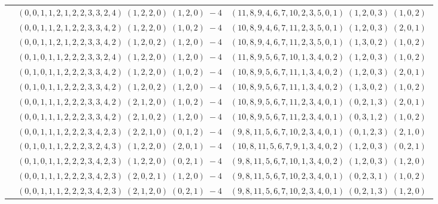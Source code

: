\documentclass[11pt]{article}
\begin{document}
\begin{longtable}[l]{|c|c|c|}
 \cline{2-3} 
 & $(0 ,0 ,1 ,1 ,2 ,1 ,2 ,2 ,3 ,3 ,2 ,4) \;(1 ,2 ,2 ,0) \;(1 ,2 ,0) \;-4$ & $(11 ,8 ,9 ,4 ,6 ,7 ,10 ,2 ,3 ,5 ,0 ,1) \;(1 ,2 ,0 ,3) \;(1 ,0 ,2) \;$\\ 
 \cline{2-3} 
 & $(0 ,0 ,1 ,1 ,2 ,1 ,2 ,2 ,3 ,3 ,4 ,2) \;(1 ,2 ,2 ,0) \;(1 ,0 ,2) \;-4$ & $(10 ,8 ,9 ,4 ,6 ,7 ,11 ,2 ,3 ,5 ,0 ,1) \;(1 ,2 ,0 ,3) \;(2 ,0 ,1) \;$\\ 
 \cline{2-3} 
 & $(0 ,0 ,1 ,1 ,2 ,1 ,2 ,2 ,3 ,3 ,4 ,2) \;(1 ,2 ,0 ,2) \;(1 ,2 ,0) \;-4$ & $(10 ,8 ,9 ,4 ,6 ,7 ,11 ,2 ,3 ,5 ,0 ,1) \;(1 ,3 ,0 ,2) \;(1 ,0 ,2) \;$\\ 
 \cline{2-3} 
 & $(0 ,1 ,0 ,1 ,1 ,2 ,2 ,2 ,3 ,3 ,2 ,4) \;(1 ,2 ,2 ,0) \;(1 ,2 ,0) \;-4$ & $(11 ,8 ,9 ,5 ,6 ,7 ,10 ,1 ,3 ,4 ,0 ,2) \;(1 ,2 ,0 ,3) \;(1 ,0 ,2) \;$\\ 
 \cline{2-3} 
 & $(0 ,1 ,0 ,1 ,1 ,2 ,2 ,2 ,3 ,3 ,4 ,2) \;(1 ,2 ,2 ,0) \;(1 ,0 ,2) \;-4$ & $(10 ,8 ,9 ,5 ,6 ,7 ,11 ,1 ,3 ,4 ,0 ,2) \;(1 ,2 ,0 ,3) \;(2 ,0 ,1) \;$\\ 
 \cline{2-3} 
 & $(0 ,1 ,0 ,1 ,1 ,2 ,2 ,2 ,3 ,3 ,4 ,2) \;(1 ,2 ,0 ,2) \;(1 ,2 ,0) \;-4$ & $(10 ,8 ,9 ,5 ,6 ,7 ,11 ,1 ,3 ,4 ,0 ,2) \;(1 ,3 ,0 ,2) \;(1 ,0 ,2) \;$\\ 
 \cline{2-3} 
 & $(0 ,0 ,1 ,1 ,1 ,2 ,2 ,2 ,3 ,3 ,4 ,2) \;(2 ,1 ,2 ,0) \;(1 ,0 ,2) \;-4$ & $(10 ,8 ,9 ,5 ,6 ,7 ,11 ,2 ,3 ,4 ,0 ,1) \;(0 ,2 ,1 ,3) \;(2 ,0 ,1) \;$\\ 
 \cline{2-3} 
 & $(0 ,0 ,1 ,1 ,1 ,2 ,2 ,2 ,3 ,3 ,4 ,2) \;(2 ,1 ,0 ,2) \;(1 ,2 ,0) \;-4$ & $(10 ,8 ,9 ,5 ,6 ,7 ,11 ,2 ,3 ,4 ,0 ,1) \;(0 ,3 ,1 ,2) \;(1 ,0 ,2) \;$\\ 
 \cline{2-3} 
 & $(0 ,0 ,1 ,1 ,1 ,2 ,2 ,2 ,3 ,4 ,2 ,3) \;(2 ,2 ,1 ,0) \;(0 ,1 ,2) \;-4$ & $(9 ,8 ,11 ,5 ,6 ,7 ,10 ,2 ,3 ,4 ,0 ,1) \;(0 ,1 ,2 ,3) \;(2 ,1 ,0) \;$\\ 
 \cline{2-3} 
 & $(0 ,1 ,0 ,1 ,1 ,2 ,2 ,2 ,3 ,2 ,4 ,3) \;(1 ,2 ,2 ,0) \;(2 ,0 ,1) \;-4$ & $(10 ,8 ,11 ,5 ,6 ,7 ,9 ,1 ,3 ,4 ,0 ,2) \;(1 ,2 ,0 ,3) \;(0 ,2 ,1) \;$\\ 
 \cline{2-3} 
 & $(0 ,1 ,0 ,1 ,1 ,2 ,2 ,2 ,3 ,4 ,2 ,3) \;(1 ,2 ,2 ,0) \;(0 ,2 ,1) \;-4$ & $(9 ,8 ,11 ,5 ,6 ,7 ,10 ,1 ,3 ,4 ,0 ,2) \;(1 ,2 ,0 ,3) \;(1 ,2 ,0) \;$\\ 
 \cline{2-3} 
 & $(0 ,0 ,1 ,1 ,1 ,2 ,2 ,2 ,3 ,4 ,2 ,3) \;(2 ,0 ,2 ,1) \;(1 ,2 ,0) \;-4$ & $(9 ,8 ,11 ,5 ,6 ,7 ,10 ,2 ,3 ,4 ,0 ,1) \;(0 ,2 ,3 ,1) \;(1 ,0 ,2) \;$\\ 
 \cline{2-3} 
 & $(0 ,0 ,1 ,1 ,1 ,2 ,2 ,2 ,3 ,4 ,2 ,3) \;(2 ,1 ,2 ,0) \;(0 ,2 ,1) \;-4$ & $(9 ,8 ,11 ,5 ,6 ,7 ,10 ,2 ,3 ,4 ,0 ,1) \;(0 ,2 ,1 ,3) \;(1 ,2 ,0) \;$\\ 

\end{longtable}
\end{document}
